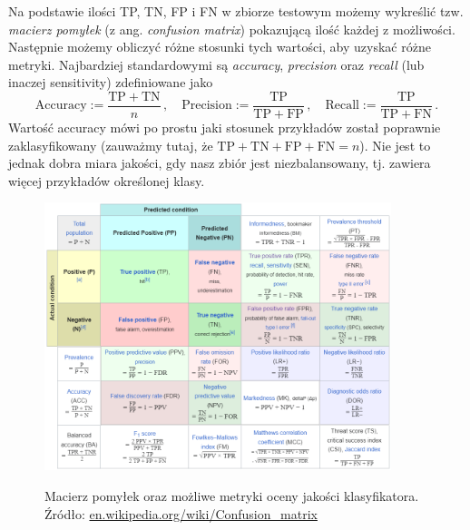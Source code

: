 \documentclass{myclass}
\numberwithin{equation}{subsection}
\begin{document}
Na podstawie ilości TP, TN, FP i FN w zbiorze testowym możemy wykreślić tzw. \emph{macierz pomyłek}
(z ang. \textit{confusion matrix}) pokazującą ilość każdej z możliwości. Następnie możemy obliczyć
różne stosunki tych wartości, aby uzyskać różne metryki. Najbardziej standardowymi są
\emph{accuracy}, \emph{precision} oraz \emph{recall} (lub inaczej sensitivity) zdefiniowane jako
\[
\mathrm{Accuracy} := \frac{\mathrm{TP} + \mathrm{TN}}{n}\,,\quad\mathrm{Precision} := \frac{\mathrm{TP}}{\mathrm{TP} + \mathrm{FP}}\,,\quad\mathrm{Recall} := \frac{\mathrm{TP}}{\mathrm{TP} + \mathrm{FN}}\,.
\]
Wartość accuracy mówi po prostu jaki stosunek przykładów został poprawnie zaklasyfikowany (zauważmy
tutaj, że \(\mathrm{TP + TN + FP + FN} = n\)). Nie jest to jednak dobra miara jakości, gdy nasz
zbiór jest niezbalansowany, tj. zawiera więcej przykładów określonej klasy.

\begin{figure}[ht]
    \centering
    \includegraphics[width=0.9\textwidth]{figs/confmat.png}
    \label{fig:confusionMatrix}
    \caption{Macierz pomyłek oraz możliwe metryki oceny jakości klasyfikatora. Źródło:
    \href{https://en.wikipedia.org/wiki/Confusion_matrix}{en.wikipedia.org/wiki/Confusion\_matrix}}
\end{figure}
\end{document}
